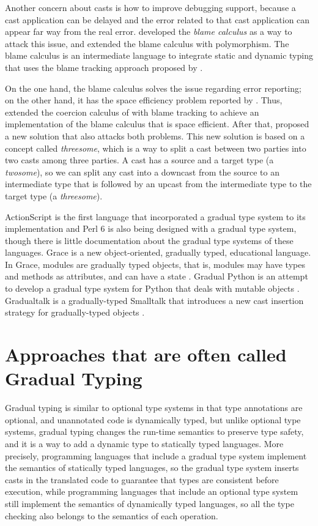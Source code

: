 Another concern about casts is how to improve debugging support,
because a cast application can be delayed and the error related
to that cast application can appear far way from the real error.
\citet{wadler2009wpc} developed the \emph{blame calculus} as a way
to attack this issue, and \citet{ahmed2011bfa} extended the
blame calculus with polymorphism.
The blame calculus is an intermediate language to integrate
static and dynamic typing that uses the blame tracking approach
proposed by \citet{findler2002chf}.

On the one hand, the blame calculus solves the issue regarding
error reporting;
on the other hand, it has the space efficiency problem reported
by \citet{herman2007sgt}.
Thus, \citet{siek2009casts} extended the coercion calculus of
\citet{herman2007sgt} with blame tracking to achieve an
implementation of the blame calculus that is space efficient.
After that, \citet{siek2010blame} proposed a new solution that also
attacks both problems.
This new solution is based on a concept called \emph{threesome},
which is a way to split a cast between two parties into two casts
among three parties.
A cast has a source and a target type (a \emph{twosome}),
so we can split any cast into a downcast from the source to an
intermediate type that is followed by an upcast from the intermediate
type to the target type (a \emph{threesome}).

ActionScript \citep{moock2007as3} is the first language that
incorporated a gradual type system to its implementation and
Perl 6 \citep{tang2007pri} is also being designed with a
gradual type system, though there is little documentation about
the gradual type systems of these languages.
Grace \citep{black2012grace,black2013sg} is a new object-oriented,
gradually typed, educational language.
In Grace, modules are gradually typed objects, that is, modules
may have types and methods as attributes, and can have a state
\citep{homer2013modules}.
Gradual Python \citep{reticulated} is an attempt to develop a
gradual type system for Python that deals with mutable objects
\citep{siek2013mutable}.
Gradualtalk \citep{allende2013gts} is a gradually-typed Smalltalk
that introduces a new cast insertion strategy for gradually-typed
objects \citep{allende2013cis}.

\section{Approaches that are often called Gradual Typing}

Gradual typing is similar to optional type systems in that type
annotations are optional, and unannotated code is dynamically
typed, but unlike optional type systems, gradual typing changes
the run-time semantics to preserve type safety, and it is a way to
add a dynamic type to statically typed languages.
More precisely, programming languages that include a gradual type
system implement the semantics of statically typed languages, so
the gradual type system inserts casts in the translated code to
guarantee that types are consistent before execution, while
programming languages that include an optional type system still
implement the semantics of dynamically typed languages, so all
the type checking also belongs to the semantics of each operation.


